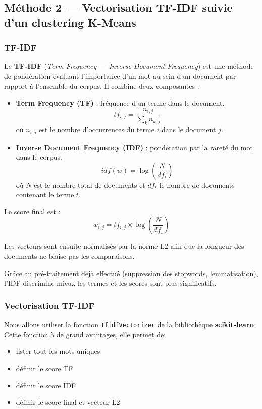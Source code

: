 \documentclass[12pt,a4paper]{article}
\begin{document}
\clearpage
\subsection{Méthode 2 — Vectorisation TF-IDF suivie d'un clustering K-Means}

\subsubsection{TF-IDF}

Le \textbf{TF-IDF} (\textit{Term Frequency — Inverse Document Frequency}) est une méthode
de pondération évaluant l'importance d'un mot au sein d'un document par rapport à l'ensemble
du corpus. Il combine deux composantes :

\begin{itemize}
  \item \textbf{Term Frequency (TF)} : fréquence d'un terme dans le document.
  $$tf_{i,j} = \frac{n_{i,j}}{\sum_k n_{k,j}}$$
  où $n_{i,j}$ est le nombre d'occurrences du terme $i$ dans le document $j$.

  \item \textbf{Inverse Document Frequency (IDF)} : pondération par la rareté du mot dans
  le corpus.
  $$idf(w) = \log\!\left(\frac{N}{df_t}\right)$$
  où $N$ est le nombre total de documents et $df_t$ le nombre de documents contenant le terme $t$.
\end{itemize}

Le score final est :
$$w_{i,j} = tf_{i,j} \times \log\!\left(\frac{N}{df_i}\right)$$

Les vecteurs sont ensuite normalisés par la norme L2 afin que la longueur des documents ne
biaise pas les comparaisons.

Grâce au pré-traitement déjà effectué (suppression des stopwords, lemmatisation), l'IDF
discrimine mieux les termes et les scores sont plus significatifs.

\pagebreak

\subsubsection{Vectorisation TF-IDF}
Nous allons utiliser la fonction \texttt{TfidfVectorizer} de la bibliothèque \textbf{scikit-learn}.
Cette fonction à de grand avantages, elle permet de:
\begin{itemize}
  \item lister tout les mots uniques
  \item définir le score TF
  \item définir le score IDF
  \item définir le score final et vecteur L2
\end{itemize}
\vspace{10px}
\end{document}

